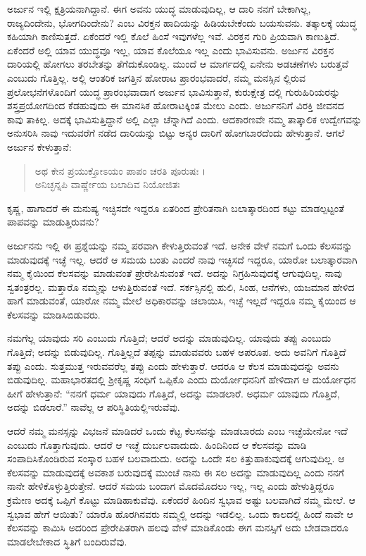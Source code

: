 ಅರ್ಜುನ ಇಲ್ಲಿ ಕ್ಷತ್ರಿಯನಾಗಿದ್ದಾನೆ. ಈಗ ಅವನು ಯುದ್ಧ ಮಾಡುವುದಿಲ್ಲ, ಆ ದಾರಿ ನನಗೆ ಬೇಕಾಗಿಲ್ಲ, ರಾಜ್ಯದಿಂದೇನು, ಭೋಗದಿಂದೇನು? ಎಂಬ ವಿರಕ್ತನ ಹಾದಿಯನ್ನು ಹಿಡಿಯಬೇಕೆಂದು ಬಯಸುವನು. ತತ್ಕಾಲಕ್ಕೆ ಯುದ್ಧ ಕಹಿಯಾಗಿ ಕಾಣಿಸುತ್ತದೆ. ಏಕೆಂದರೆ ಇಲ್ಲಿ ಕೊಲೆ ಹಿಂಸೆ ಇವುಗಳೆಲ್ಲ ಇವೆ. ವಿರಕ್ತನ ಗುರಿ ಪ್ರಿಯವಾಗಿ ಕಾಣುತ್ತಿದೆ. ಏಕೆಂದರೆ ಅಲ್ಲಿ ಯಾವ ಯುದ್ಧವೂ ಇಲ್ಲ, ಯಾವ ಕೊಲೆಯೂ ಇಲ್ಲ ಎಂದು ಭಾವಿಸುವನು. ಅರ್ಜುನ ವಿರಕ್ತನ ದಾರಿಯಲ್ಲಿ ಹೋಗಲು ತರಬೇತನ್ನು ತೆಗೆದುಕೊಂಡಿಲ್ಲ. ಮುಂದೆ ಆ ಮಾರ್ಗದಲ್ಲಿ ಏನೇನು ಅಡಚಣೆಗಳು ಬರುತ್ತವೆ ಎಂಬುದು ಗೊತ್ತಿಲ್ಲ. ಅಲ್ಲಿ ಆಂತರಿಕ ಜಗತ್ತಿನ ಹೋರಾಟ ಪ್ರಾರಂಭವಾದರೆ, ನಮ್ಮ ಮನಸ್ಸಿನ ಲ್ಲಿರುವ ಪ್ರಲೋಭನೆಗಳೊಂದಿಗೆ ಯುದ್ಧ ಪ್ರಾರಂಭವಾದಾಗ ಅರ್ಜುನ ಭಾವಿಸುತ್ತಾನೆ, ಕುರುಕ್ಷೇತ್ರ ದಲ್ಲಿ ಗುರುಹಿರಿಯರನ್ನು ಶಸ್ತ್ರಪ್ರಯೋಗದಿಂದ ಕೆಡಹುವುದು ಈ ಮಾನಸಿಕ ಹೋರಾಟಕ್ಕಿಂತ ಮೇಲು ಎಂದು. ಅರ್ಜುನನಿಗೆ ವಿರಕ್ತಿ ಜೀವನದ ಕಾವು ತಾಕಿಲ್ಲ. ಅದಕ್ಕೆ ಭಾವಿಸುತ್ತಿದ್ದಾನೆ ಅಲ್ಲಿ ಎಲ್ಲಾ ಚೆನ್ನಾಗಿದೆ ಎಂದು. ಆದಕಾರಣವೇ ನಮ್ಮ ತಾತ್ಕಾಲಿಕ ಉದ್ವೇಗವನ್ನು ಅನುಸರಿಸಿ ನಾವು ಇದುವರೆಗೆ ನಡೆದ ದಾರಿಯನ್ನು ಬಿಟ್ಟು ಅನ್ಯರ ದಾರಿಗೆ ಹೋಗಬಾರದೆಂದು ಹೇಳುತ್ತಾನೆ. ಆಗಲೆ ಅರ್ಜುನ ಕೇಳುತ್ತಾನೆ:

\begin{verse}
ಅಥ ಕೇನ ಪ್ರಯುಕ್ತೋಽಯಂ ಪಾಪಂ ಚರತಿ ಪೂರುಷಃ ।\\ಅನಿಚ್ಛನ್ನಪಿ ವಾರ್ಷ್ಣೇಯ ಬಲಾದಿವ ನಿಯೋಜಿತಃ 
\end{verse}

{\small ಕೃಷ್ಣ, ಹಾಗಾದರೆ ಈ ಮನುಷ್ಯ ಇಚ್ಛಿಸದೇ ಇದ್ದರೂ ಏತರಿಂದ ಪ್ರೇರಿತನಾಗಿ ಬಲಾತ್ಕಾರದಿಂದ ಕಟ್ಟು ಮಾಡಲ್ಪಟ್ಟಂತೆ ಪಾಪವನ್ನು ಮಾಡುತ್ತಿರುವನು?}

ಅರ್ಜುನನು ಇಲ್ಲಿ ಈ ಪ್ರಶ್ನೆಯನ್ನು ನಮ್ಮ ಪರವಾಗಿ ಕೇಳುತ್ತಿರುವಂತೆ ಇದೆ. ಅನೇಕ ವೇಳೆ ನಮಗೆ ಒಂದು ಕೆಲಸವನ್ನು ಮಾಡುವುದಕ್ಕೆ ಇಚ್ಛೆ ಇಲ್ಲ. ಆದರೆ ಆ ಸಮಯ ಬಂತು ಎಂದರೆ ನಾವು ಇಚ್ಛಿಸದೆ ಇದ್ದರೂ, ಯಾರೋ ಬಲಾತ್ಕಾರವಾಗಿ ನಮ್ಮ ಕೈಯಿಂದ ಕೆಲಸವನ್ನು ಮಾಡುವಂತೆ ಪ್ರೇರೇಪಿಸುವಂತೆ ಇದೆ. ಅದನ್ನು ನಿಗ್ರಹಿಸುವುದಕ್ಕೆ ಆಗುವುದಿಲ್ಲ. ನಾವು ಸ್ವತಂತ್ರರಲ್ಲ. ಮತ್ತಾರೊ ನಮ್ಮನ್ನು ಆಳುತ್ತಿರುವಂತೆ ಇದೆ. ಸರ್ಕಸ್ಸಿನಲ್ಲಿ ಹುಲಿ, ಸಿಂಹ, ಆನೆಗಳು, ಯಜಮಾನ ಹೇಳಿದ ಹಾಗೆ ಮಾಡುವಂತೆ, ಯಾರೋ ನಮ್ಮ ಮೇಲೆ ಅಧಿಕಾರವನ್ನು ಚಲಾಯಿಸಿ, ಇಚ್ಛೆ ಇಲ್ಲದೆ ಇದ್ದರೂ ನಮ್ಮ ಕೈಯಿಂದ ಆ ಕೆಲಸವನ್ನು ಮಾಡಿಸಿಬಿಡುವರು.

ನಮಗೆಲ್ಲ ಯಾವುದು ಸರಿ ಎಂಬುದು ಗೊತ್ತಿದೆ; ಆದರೆ ಅದನ್ನು ಮಾಡುವುದಿಲ್ಲ. ಯಾವುದು ತಪ್ಪು ಎಂಬುದು ಗೊತ್ತಿದೆ; ಅದನ್ನು ಬಿಡುವುದಿಲ್ಲ. ಗೊತ್ತಿಲ್ಲದೆ ತಪ್ಪನ್ನು ಮಾಡುವವರು ಬಹಳ ಅಪರೂಪ. ಅದು ಅವನಿಗೆ ಗೊತ್ತಿದೆ ತಪ್ಪು ಎಂದು. ಸುತ್ತಮುತ್ತ ಇರುವವರೆಲ್ಲ ತಪ್ಪು ಎಂದು ಹೇಳುತ್ತಾರೆ. ಆದರೂ ಆ ಕೆಲಸ ಮಾಡುವುದನ್ನು ಅವನು ಬಿಡುವುದಿಲ್ಲ. ಮಹಾಭಾರತದಲ್ಲಿ ಶ್ರೀಕೃಷ್ಣ ಸಂಧಿಗೆ ಒಪ್ಪಿಕೊ ಎಂದು ದುರ್ಯೋಧನನಿಗೆ ಹೇಳಿದಾಗ ಆ ದುರ್ಯೋಧನ ಹೀಗೆ ಹೇಳುತ್ತಾನೆ: “ನನಗೆ ಧರ್ಮ ಯಾವುದು ಗೊತ್ತಿದೆ, ಅದನ್ನು ಮಾಡಲಾರೆ. ಅಧರ್ಮ ಯಾವುದು ಗೊತ್ತಿದೆ, ಅದನ್ನು ಬಿಡಲಾರೆ.” ನಾವೆಲ್ಲ ಆ ಪರಿಸ್ಥಿತಿಯಲ್ಲಿಇರುವೆವು.

ಆದರೆ ನಮ್ಮ ಮನಸ್ಸನ್ನು ವಿಭಜನೆ ಮಾಡಿದರೆ ಒಂದು ಕೆಟ್ಟ ಕೆಲಸವನ್ನು ಮಾಡಬಾರದು ಎಂಬ ಇಚ್ಛೆಯೇನೋ ಇದೆ ಎಂಬುದು ಗೊತ್ತಾಗುವುದು. ಆದರೆ ಆ ಇಚ್ಛೆ ದುರ್ಬಲವಾದುದು. ಹಿಂದಿನಿಂದ ಆ ಕೆಲಸವನ್ನು ಮಾಡಿ ಸಂಪಾದಿಸಿಕೊಂಡಿರುವ ಸಂಸ್ಕಾರ ಬಹಳ ಬಲವಾದುದು. ಅದನ್ನು ಒಂದೇ ಸಲ ಕಿತ್ತುಹಾಕುವುದಕ್ಕೆ ಆಗುವುದಿಲ್ಲ. ಆ ಕೆಲಸವನ್ನು ಮಾಡುವುದಕ್ಕೆ ಅವಕಾಶ ಬರುವುದಕ್ಕೆ ಮುಂಚೆ ನಾನು ಈ ಸಲ ಅದನ್ನು ಮಾಡುವುದಿಲ್ಲ ಎಂದು ನನಗೆ ನಾನೇ ಹೇಳಿಕೊಳ್ಳುತ್ತಿರುತ್ತೇನೆ. ಆದರೆ ಸಮಯ ಬಂದಾಗ ಮೊದಮೊದಲು ಇಲ್ಲ, ಇಲ್ಲ ಎಂದು ಹೇಳುತ್ತಿದ್ದರೂ ಕ್ರಮೇಣ ಅದಕ್ಕೆ ಒಪ್ಪಿಗೆ ಕೊಟ್ಟು ಮಾಡಿಹಾಕುವೆವು. ಏಕೆಂದರೆ ಹಿಂದಿನ ಸ್ವಭಾವ ಅಷ್ಟು ಬಲವಾಗಿದೆ ನಮ್ಮ ಮೇಲೆ. ಆ ಸ್ವಭಾವ ಹೇಗೆ ಆಯಿತು? ಯಾರೊ ಹೊರಗಿನವರು ನಮ್ಮಲ್ಲಿ ಅದನ್ನು ಇಡಲಿಲ್ಲ. ಒಂದು ಕಾಲದಲ್ಲಿ ಹಿಂದೆ ನಾವೇ ಆ ಕೆಲಸವನ್ನು ಕಾಮಿಸಿ ಅದರಿಂದ ಪ್ರೇರೇಪಿತರಾಗಿ ಹಲವು ವೇಳೆ ಮಾಡಿಕೊಂಡು ಈಗ ಮನಸ್ಸಿಗೆ ಅದು ಬೇಡವಾದರೂ ಮಾಡಲೇಬೇಕಾದ ಸ್ಥಿತಿಗೆ ಬಂದಿರುವೆವು.

